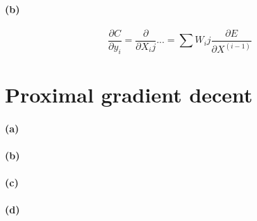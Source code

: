 \documentclass{article}
\begin{document}
\paragraph{(b)}
\begin{equation}
\frac{\partial C}{\partial y_i} = \frac{\partial}{\partial X_ij}{...} = \sum\nolimits {W_ij}{ \frac{\partial E}{\partial X^(i-1)}}
\end{equation}

\section{Proximal gradient decent}

\paragraph{(a)}
\paragraph{(b)}
\paragraph{(c)}
\paragraph{(d)}
\end{document}
